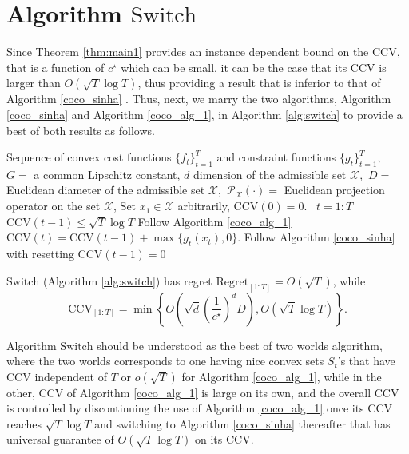 \section{Algorithm $\mathrm{Switch}$}\label{sec:algswitch}

Since Theorem \ref{thm:main1} provides an instance dependent bound on the CCV, that is a function of $c^\star$ which can be small, it can be the case that its CCV is larger than $O(\sqrt{T}\log T)$, thus providing a result that is inferior to that of Algorithm \ref{coco_sinha} \cite{Sinha2024}. Thus, next, we marry the two algorithms, Algorithm \ref{coco_sinha} and Algorithm \ref{coco_alg_1}, in Algorithm \ref{alg:switch} to provide a best of both results as follows. 


\begin{algorithm}[tb]
   \caption{$\mathrm{Switch}$}
   \label{alg:switch}
\begin{algorithmic}[1]
    Sequence of convex cost functions $\{f_t\}_{t=1}^T$ and constraint functions $\{g_t\}_{t=1}^T,$ $G=$ a common Lipschitz constant,  $d$ dimension  of the admissible set $\mathcal{X},$
    $D=$ Euclidean diameter of the admissible set $\mathcal{X},$ $\mathcal{P}_\mathcal{X}(\cdot)=$ Euclidean projection operator on the set $\mathcal{X}$,       Set $ x_1 \in \mathcal{X}$ arbitrarily, $\text{CCV}(0)=0$.
    \ {$t=1:T$}
   \State {} {$\text{CCV}(t-1) \le \sqrt{T}\log T$}
   \State \quad \quad Follow Algorithm \ref{coco_alg_1}
   \State  \quad  \quad $\text{CCV}(t)=\text{CCV}(t-1)+\max\{g_t(x_t),0\}.$
   \State {} 
   \State \quad \quad Follow Algorithm \ref{coco_sinha} with resetting $\text{CCV}(t-1)=0$
   \State {} 
\end{algorithmic}
\end{algorithm}

 \begin{theorem}\label{thm:main2}
$\mathrm{Switch}$ (Algorithm \ref{alg:switch}) has regret $\textrm{Regret}_{[1:T]} =O(\sqrt{T})$, while    $$\text{CCV}_{[1:T]}=
\min\left\{O\left(\sqrt{d} \left(\frac{1}{c^\star}\right)^{d}D\right), O(\sqrt{T}\log T)\right\}.$$
\end{theorem}
 
Algorithm $\mathrm{Switch}$ should be understood as the best of two worlds algorithm, where the two worlds corresponds to one having nice convex sets $S_t$'s that have CCV independent of $T$ or $o(\sqrt{T})$ for 
Algorithm \ref{coco_alg_1}, while in the other, CCV of Algorithm \ref{coco_alg_1} is large on its own, and the overall CCV is controlled by discontinuing the use of Algorithm \ref{coco_alg_1} once its CCV reaches $\sqrt{T}\log T$ and switching to Algorithm \ref{coco_sinha} thereafter that has universal guarantee of $O(\sqrt{T}\log T)$ on its CCV.
 
